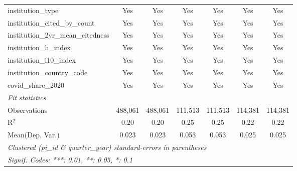 \begin{tabular}{lcccccc}
   institution\_type                                           & Yes            & Yes            & Yes            & Yes            & Yes            & Yes\\  
   institution\_cited\_by\_count                               & Yes            & Yes            & Yes            & Yes            & Yes            & Yes\\  
   institution\_2yr\_mean\_citedness                           & Yes            & Yes            & Yes            & Yes            & Yes            & Yes\\  
   institution\_h\_index                                       & Yes            & Yes            & Yes            & Yes            & Yes            & Yes\\  
   institution\_i10\_index                                     & Yes            & Yes            & Yes            & Yes            & Yes            & Yes\\  
   institution\_country\_code                                  & Yes            & Yes            & Yes            & Yes            & Yes            & Yes\\  
   covid\_share\_2020                                          & Yes            & Yes            & Yes            & Yes            & Yes            & Yes\\  
   \midrule
   \emph{Fit statistics}\\
   Observations                                                & 488,061        & 488,061        & 111,513        & 111,513        & 114,381        & 114,381\\  
   R$^2$                                                       & 0.20           & 0.20           & 0.25           & 0.25           & 0.22           & 0.22\\  
Mean(Dep. Var.) & 0.023 & 0.023 & 0.053 & 0.053 & 0.025 & 0.025 \\
   \midrule \midrule
   \multicolumn{7}{l}{\emph{Clustered (pi\_id \& quarter\_year) standard-errors in parentheses}}\\
   \multicolumn{7}{l}{\emph{Signif. Codes: ***: 0.01, **: 0.05, *: 0.1}}\\
\end{tabular}
\par\endgroup
